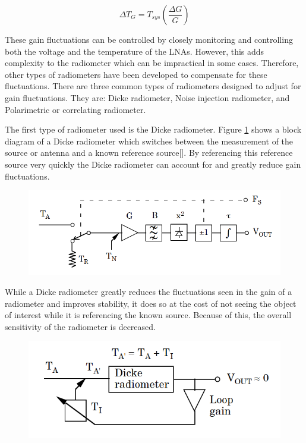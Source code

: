 
\begin{equation} \label{eq:rad_stability}
\Delta T_G=T_{sys} \left(\frac{\Delta G}{G}\right)
\end{equation}

These gain fluctuations can be controlled by closely monitoring and controlling both the voltage and the temperature of the LNAs. However, this adds complexity to the radiometer which can be impractical in some cases.  Therefore, other types of radiometers have been developed to compensate for these fluctuations.  There are three common types of radiometers designed to adjust for gain fluctuations.  They are: Dicke radiometer, Noise injection radiometer, and Polarimetric or correlating radiometer.

The first type of radiometer used is the Dicke radiometer.  Figure \ref{dicke_radiometer} shows a block diagram of a Dicke radiometer which switches between the measurement of the source or antenna and a known reference source[\cite{Dicke}].  By referencing this reference source very quickly the Dicke radiometer can account for and greatly reduce gain fluctuations.  

{\begin{figure}[h!tb] 
\centering
\includegraphics[width=\textwidth]{Images/Dicke_block.png}
\label{dicke_radiometer}
\end{figure}
}

While a Dicke radiometer greatly reduces the fluctuations seen in the gain of a radiometer and improves stability, it does so at the cost of not seeing the object of interest while it is referencing the known source.  Because of this, the overall sensitivity of the radiometer is decreased.

{\begin{figure}[h!tb] 
\centering
\includegraphics[width=\textwidth]{Images/NoiseInj_block.png}
\label{NoiseInj_radiometer}
\end{figure}
}

